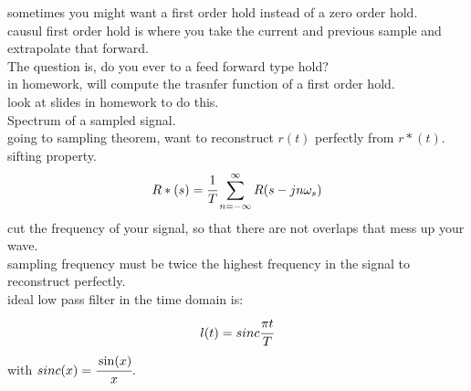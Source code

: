 \documentclass{article}
\begin{document}
sometimes you might want a first order hold instead of a zero order hold.\\
causul first order hold is where you take the current and previous sample and extrapolate that forward.\\
The question is, do you ever to a feed forward type hold?\\

in homework, will compute the trasnfer function of a first order hold.\\
look at slides in homework to do this.\\

Spectrum of a sampled signal.\\
going to sampling theorem, want to reconstruct $r(t)$ perfectly from $r*(t)$.\\
sifting property.\\

\[R*(s)=\cfrac{1}{T}\sum_{n=-\infty}^\infty R(s-jn\omega_s)\]
cut the frequency of your signal, so that there are not overlaps that mess up your wave.\\
sampling frequency must be twice the highest frequency in the signal to reconstruct perfectly.\\
ideal low pass filter in the time domain is:
\[l(t)=sinc\cfrac{\pi t}{T}\]
with $sinc(x)=\cfrac{\sin(x)}{x}$.\\
\end{document}
